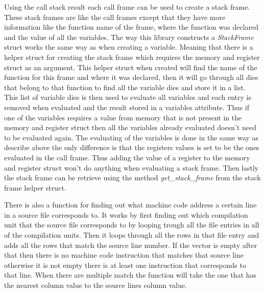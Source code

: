 Using the call stack result each call frame can be used to create a stack frame.
These stack frames are like the call frames except that they have more information like the function name of the frame, where the function was declared and the value of all the variables.
The way this library  constructs a \emph{StackFrame} struct works the same way as when creating a variable.
Meaning that there is a helper struct for creating the stack frame which requires the memory and register struct as an argument.
This helper struct when created will find the name of the function for this frame and where it was declared, then it will go through all dies that belong to that function to find all the variable dies and store it in a list.
This list of variable dies is then used to evaluate all variables and each entry is removed when evaluated and the result stored in a variables attribute.
Thus if one of the variables requires a value from memory that is not present in the memory and register struct then all the variables already evaluated doesn't need to be evaluated again.
The evaluating of the variables is done in the same way as describe above the only difference is that the registers values is set to be the ones evaluated in the call frame.
Thus adding the value of a register to the memory and register struct won't do anything when evaluating a stack frame.
Then lastly the stack frame can be retrieve using the method \emph{get\_stack\_frame} from the stack frame helper struct.


There is also a function for finding out what machine code address a certain line in a source file corresponds to.
It works by first finding out which compilation unit that the source file corresponds to by looping trough all the file entries in all of the compilation units. 
Then it loops through all the rows in that file entry and adds all the rows that match the source line number.
If the vector is empty after that then there is no machine code instruction that matches that source line otherwise it is not empty there is at least one instruction that corresponds to that line.
When there are multiple match the function will take the one that has the nearest column value to the source lines column value.

